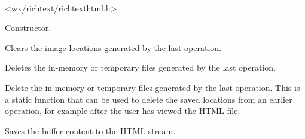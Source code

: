 
\\


<wx/richtext/richtexthtml.h>





\label{wxrichtexthtmlhandlerwxrichtexthtmlhandler}


Constructor.

\label{wxrichtexthtmlhandlercleartemporaryimagelocations}


Clears the image locations generated by the last operation.

\label{wxrichtexthtmlhandlerdeletetemporaryimages}


Deletes the in-memory or temporary files generated by the last operation.


Delete the in-memory or temporary files generated by the last operation. This is a static
function that can be used to delete the saved locations from an earlier operation,
for example after the user has viewed the HTML file.

\label{wxrichtexthtmlhandlerdosavefile}


Saves the buffer content to the HTML stream.

\label{wxrichtexthtmlhandlergetfontsizemapping}

